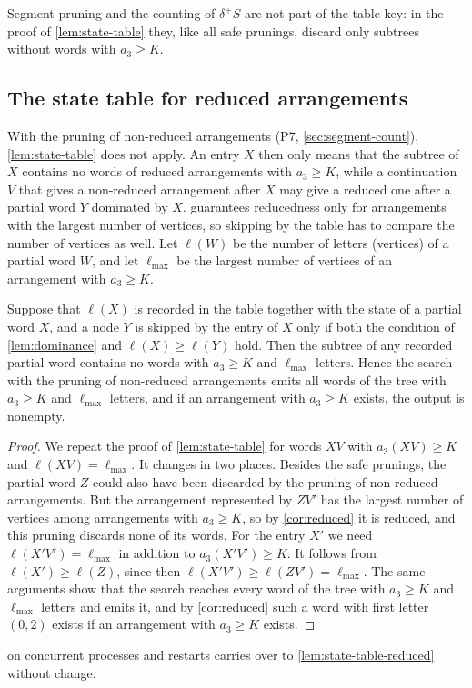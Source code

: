 Segment pruning and the counting of $\delta^+S$ are not part of the table key: in the proof of \cref{lem:state-table} they, like all safe prunings, discard only subtrees without words with $a_3\ge K$.

\subsection{The state table for reduced arrangements}

With the pruning of non-reduced arrangements (P7, \cref{sec:segment-count}), \cref{lem:state-table} does not apply. An entry $X$ then only means that the subtree of $X$ contains no words of reduced arrangements with $a_3\ge K$, while a continuation $V$ that gives a non-reduced arrangement after $X$ may give a reduced one after a partial word $Y$ dominated by $X$.
 guarantees reducedness only for arrangements with the largest number of vertices, so skipping by the table has to compare the number of vertices as well.
Let $\ell(W)$ be the number of letters (vertices) of a partial word $W$, and let $\ell_{\max}$ be the largest number of vertices of an arrangement with $a_3\ge K$.

\begin{lemma}\label{lem:state-table-reduced}
Suppose that $\ell(X)$ is recorded in the table together with the state of a partial word $X$, and a node $Y$ is skipped by the entry of $X$ only if both the condition of \cref{lem:dominance} and $\ell(X)\ge\ell(Y)$ hold.
Then the subtree of any recorded partial word contains no words with $a_3\ge K$ and $\ell_{\max}$ letters.
Hence the search with the pruning of non-reduced arrangements emits all words of the tree with $a_3\ge K$ and $\ell_{\max}$ letters, and if an arrangement with $a_3\ge K$ exists, the output is nonempty.
\end{lemma}

\begin{proof}
We repeat the proof of \cref{lem:state-table} for words $XV$ with $a_3(XV)\ge K$ and $\ell(XV)=\ell_{\max}$. It changes in two places.
Besides the safe prunings, the partial word $Z$ could also have been discarded by the pruning of non-reduced arrangements. But the arrangement represented by $ZV'$ has the largest number of vertices among arrangements with $a_3\ge K$, so by \cref{cor:reduced} it is reduced, and this pruning discards none of its words.
For the entry $X'$ we need $\ell(X'V')=\ell_{\max}$ in addition to $a_3(X'V')\ge K$. It follows from $\ell(X')\ge\ell(Z)$, since then $\ell(X'V')\ge\ell(ZV')=\ell_{\max}$.
The same arguments show that the search reaches every word of the tree with $a_3\ge K$ and $\ell_{\max}$ letters and emits it, and by \cref{cor:reduced} such a word with first letter $(0,2)$ exists if an arrangement with $a_3\ge K$ exists.
\end{proof}

 on concurrent processes and restarts carries over to \cref{lem:state-table-reduced} without change.
